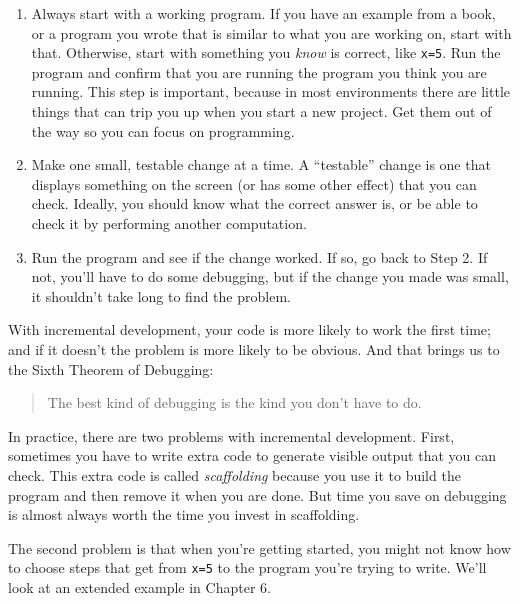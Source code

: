 \begin{enumerate}

\item Always start with a working program.  If you have an
example from a book, or a program you wrote that is similar to
what you are working on, start with that.  Otherwise, start with
something you {\em know} is correct, like {\tt x=5}.  Run the program
and confirm that you are running the program you think you are
running.
This step is important, because in most environments there
are little things that can trip you up when you start a new
project.  Get them out of the way so you can focus on programming.

\item Make one small, testable change at a time.  A ``testable''
change is one that displays something on the screen (or has some
other effect) that you can check.  Ideally, you should know what
the correct answer is, or be able to check it by performing another
computation.

\item Run the program and see if the change worked.  If so, go back
to Step 2.  If not, you'll have to do some debugging, but if the
change you made was small, it shouldn't take long to find the problem.

\end{enumerate}


With incremental development, your code is more likely to work the first time; and if it doesn't the problem is more likely to be obvious.  And that brings us to the Sixth Theorem of Debugging:

\begin{quote}
The best kind of debugging is the kind you don't have to do.
\end{quote}

In practice, there are two problems with incremental development. 
First, sometimes you have to write extra code to
generate visible output that you can check.  This extra code is
called \emph{scaffolding} because you use it to build the program
and then remove it when you are done.  But time you save on
debugging is almost always worth the time you invest in
scaffolding.

The second problem is that when you're getting started, you might not know how to
choose steps that get from {\tt x=5} to the program you're trying
to write.  We'll look at an extended example in Chapter 6.

